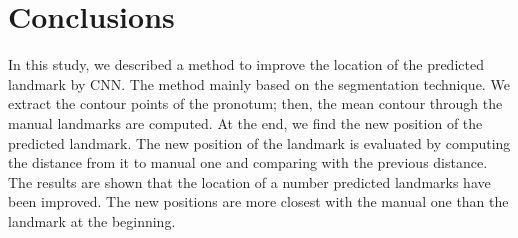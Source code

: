 \documentclass[12pt,a4paper]{article}
\begin{document}
\section{Conclusions}
In this study, we described a method to improve the location of the predicted landmark by CNN. The method mainly based on the segmentation technique. We extract the contour points of the pronotum; then, the mean contour through the manual landmarks are computed. At the end, we find the new position of the predicted landmark. The new position of the landmark is evaluated by computing the distance from it to manual one and comparing with the previous distance. The results are shown that the location of a number predicted landmarks have been improved. The new positions are more closest with the manual one than the landmark at the beginning.


\pagebreak
\end{document}
